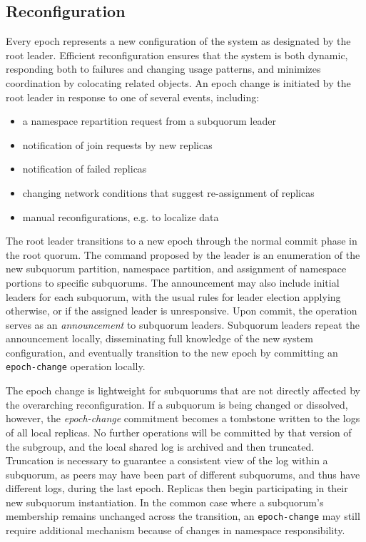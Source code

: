 \documentclass[10pt,conference]{IEEEtran}
\begin{document}

\subsection{Reconfiguration}
\label{section:reconfiguration}


Every epoch represents a new configuration of the system as designated
by the root leader.
Efficient reconfiguration ensures that the system is both dynamic,
responding both to failures and changing usage patterns, and minimizes
coordination by colocating related objects.
An epoch change is initiated by the root leader in response to one of
several events, including:

\begin{itemize}
    \item a namespace repartition request from a subquorum leader
    \item notification of join requests by new replicas
    \item notification of failed replicas
    \item changing network conditions that suggest re-assignment of replicas
    \item manual reconfigurations, e.g. to localize data
\end{itemize}

The root leader transitions to a new epoch through the normal commit
phase in the root quorum.
The command proposed by the leader is an enumeration of the new subquorum
partition, namespace partition, and assignment of namespace portions to
specific subquorums.
The announcement may also include initial leaders for each subquorum,
with the usual rules for leader election applying otherwise, or if the
assigned leader is unresponsive.
Upon commit, the operation serves as an \emph{announcement} to subquorum
leaders.
Subquorum leaders repeat the announcement locally, disseminating full
knowledge of the new system configuration, and eventually transition to
the new epoch by committing an \texttt{epoch-change} operation locally.

The epoch change is lightweight for subquorums that are not directly
affected by the overarching reconfiguration.
If a subquorum is being changed or dissolved, however, the
\emph{epoch-change} commitment becomes a tombstone written to the logs
of all local replicas.
No further operations will be committed by that version of the subgroup,
and the local shared log is archived and then truncated.
Truncation is necessary to guarantee a consistent view of the log within
a subquorum, as peers may have been part of different subquorums, and
thus have different logs, during the last epoch.
Replicas then begin participating in their new subquorum instantiation.
In the common case where a subquorum's membership remains unchanged
across the transition, an \texttt{epoch-change} may still require
additional mechanism because of changes in namespace responsibility.
\end{document}

